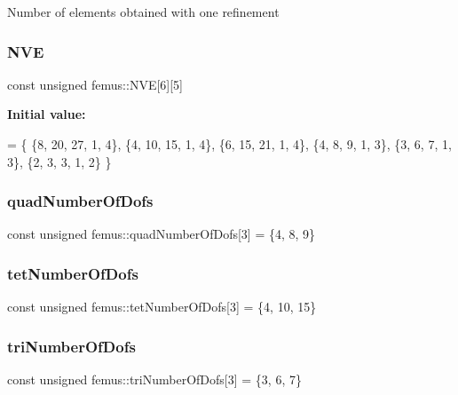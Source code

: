 Number of elements obtained with one refinement \mbox{\label{namespacefemus_a3d53e4927b8f0f363df71826cc9d8b9c}} 
\subsubsection{\texorpdfstring{N\+VE}{NVE}}
{\footnotesize\ttfamily const unsigned femus\+::\+N\+VE\mbox{[}6\mbox{]}\mbox{[}5\mbox{]}}

{\bfseries Initial value\+:}
\begin{DoxyCode}
= \{
    \{8, 20, 27, 1, 4\}, 
    \{4, 10, 15, 1, 4\}, 
    \{6, 15, 21, 1, 4\}, 
    \{4, 8, 9, 1, 3\}, 
    \{3, 6, 7, 1, 3\}, 
    \{2, 3, 3, 1, 2\}  
  \}
\end{DoxyCode}
\mbox{\label{namespacefemus_aa96ee7b7b7a40356557c4901525affb1}} 
\subsubsection{\texorpdfstring{quad\+Number\+Of\+Dofs}{quadNumberOfDofs}}
{\footnotesize\ttfamily const unsigned femus\+::quad\+Number\+Of\+Dofs\mbox{[}3\mbox{]} = \{4, 8, 9\}}

\mbox{\label{namespacefemus_a6c7ed3acdc679619e3facecfbc86e342}} 
\subsubsection{\texorpdfstring{tet\+Number\+Of\+Dofs}{tetNumberOfDofs}}
{\footnotesize\ttfamily const unsigned femus\+::tet\+Number\+Of\+Dofs\mbox{[}3\mbox{]} = \{4, 10, 15\}}

\mbox{\label{namespacefemus_a52acce8e5ee8a9ac805ec5be5e265bcf}} 
\subsubsection{\texorpdfstring{tri\+Number\+Of\+Dofs}{triNumberOfDofs}}
{\footnotesize\ttfamily const unsigned femus\+::tri\+Number\+Of\+Dofs\mbox{[}3\mbox{]} = \{3, 6, 7\}}

